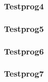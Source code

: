 \documentclass[
  ngerman
  ,12pt
  ,pdftex
]{article}
\begin{document}
\subsubsection*{Testprog4}

\subsubsection*{Testprog5}

\subsubsection*{Testprog6}

\subsubsection*{Testprog7}


    

    
\end{document}
